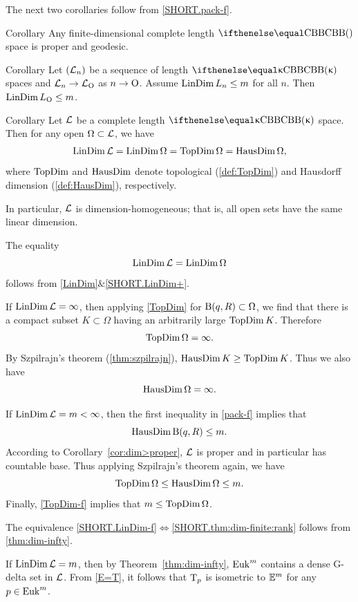 The next two corollaries follow from \ref{SHORT.pack-f}.

\begin{thm}{Corollary}\label{cor:dim>proper}
Any finite-dimensional complete length $\Alex{}$ space is proper and geodesic.
\end{thm}

\begin{thm}{Corollary} Let $(\mathcal{L}_n)$ be a sequence of length $\Alex\kappa$ spaces and $\spc{L}_n\to \spc{L}_\o$ as $n\to\o$.
Assume $\LinDim L_n\le m$ for all $n$.
Then $\LinDim L_\o\le m$.
\end{thm}

\begin{thm}{Corollary}\label{dim=dim} 
Let $\mathcal{L}$ be a complete length $\Alex{\kappa}$ space. 
Then for any open $\Omega\subset \spc{L}$, we have
\[
\mathop{\rm LinDim}\nolimits \mathcal{L}=
\mathop{\rm LinDim}\nolimits\Omega =
\mathop{\rm TopDim}\nolimits\Omega=
\mathop{\rm HausDim}\nolimits\Omega,
\]
where $\mathop{\rm TopDim}\nolimits$ and $\mathop{\rm HausDim}\nolimits$ denote topological (\ref{def:TopDim}) and Hausdorff dimension (\ref{def:HausDim}), respectively.

In particular, $\mathcal{L}$ is dimension-homogeneous; that is, all open sets have the same linear dimension.
\end{thm}

The equality
\[\mathop{\rm LinDim}\nolimits \mathcal{L}= \mathop{\rm LinDim}\nolimits\Omega\]
follows from \ref{LinDim}$\&$\ref{SHORT.LinDim+}.

If $\mathop{\rm LinDim}\nolimits \mathcal{L}=\infty$, then
applying \ref{TopDim} for $\oBall(q,R)\subset \Omega$, we find that there is a compact subset $K\subset \Omega$ having an arbitrarily large $\mathop{\rm TopDim}\nolimits K$. Therefore
\[\mathop{\rm TopDim}\nolimits\Omega=\infty.\] 
By Szpilrajn's theorem (\ref{thm:szpilrajn}),
$\HausDim K\ge \TopDim K$.
Thus we also have 
\[\mathop{\rm HausDim}\nolimits\Omega=\infty.\]

If $\mathop{\rm LinDim}\nolimits \mathcal{L}=m<\infty$, then the first inequality in \ref{pack-f} 
implies that \[\HausDim \oBall(q,R)\le m.\] 
According to Corollary~\ref{cor:dim>proper}, 
$\mathcal{L}$ is proper and in particular has countable base. 
Thus applying Szpilrajn's theorem again, we have
\[\TopDim\Omega\le \HausDim \Omega\le m.\]
Finally, \ref{TopDim-f} implies that $m\le\TopDim\Omega$.
\qeds

The equivalence \ref{SHORT.LinDim-f}$\Leftrightarrow$\ref{SHORT.thm:dim-finite:rank} follows from \ref{thm:dim-infty}.

If $\mathop{\rm LinDim}\nolimits\mathcal{L}=m$, then by Theorem~\ref{thm:dim-infty}, 
$\mathop{\rm Euk}\nolimits^m$ contains a dense G-delta set in $\mathcal{L}$.
From \ref{E=T}, it follows that $\text{\rm T}_p$ is isometric to $\mathbb{E}^m$ for any $p\in \Euk^m$.

